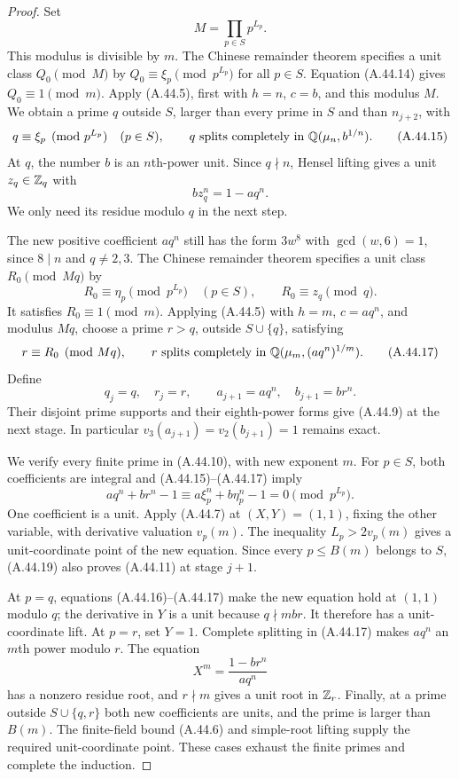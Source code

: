 \begin{proof}
Set
\[
                  M=\prod_{p\in S}p^{L_p}.
\]
This modulus is divisible by $m$. The Chinese remainder
theorem specifies a unit class $Q_0\pmod M$ by
$Q_0\equiv\xi_p\pmod {p^{L_p}}$ for all $p\in S$.
Equation (A.44.14) gives $Q_0\equiv1\pmod m$.
Apply (A.44.5), first with $h=n$, $c=b$, and this
modulus $M$. We obtain a prime $q$ outside $S$, larger
than every prime in $S$ and than $n_{j+2}$, with
\[
 q\equiv\xi_p\pmod {p^{L_p}}\quad(p\in S),
 \qquad q\text{ splits completely in }
                    \mathbb Q(\mu_n,b^{1/n}).
 \tag{A.44.15}
\]
At $q$, the number $b$ is an $n$th-power unit. Since
$q\nmid n$, Hensel lifting gives a unit $z_q\in\mathbb Z_q$
with
\[
                   b z_q^n=1-aq^n.
 \tag{A.44.16}
\]
We only need its residue modulo $q$ in the next step.

The new positive coefficient $a q^n$ still has the
form $3w^8$ with $\gcd(w,6)=1$, since $8\mid n$
and $q\ne2,3$. The Chinese remainder theorem specifies
a unit class $R_0\pmod {Mq}$ by
\[
 R_0\equiv\eta_p\pmod {p^{L_p}}\quad(p\in S),
 \qquad R_0\equiv z_q\pmod q.
\]
It satisfies $R_0\equiv1\pmod m$. Applying (A.44.5)
with $h=m$, $c=a q^n$, and modulus $Mq$, choose a
prime $r>q$, outside $S\cup\{q\}$, satisfying
\[
 r\equiv R_0\pmod {Mq},
 \qquad r\text{ splits completely in }
               \mathbb Q(\mu_m,(a q^n)^{1/m}).
 \tag{A.44.17}
\]
Define
\[
 q_j=q,\quad r_j=r,\qquad
 a_{j+1}=a q^n,\quad b_{j+1}=b r^n.
 \tag{A.44.18}
\]
Their disjoint prime supports and their eighth-power
forms give (A.44.9) at the next stage. In particular
$v_3(a_{j+1})=v_2(b_{j+1})=1$ remains exact.

We verify every finite prime in (A.44.10), with new
exponent $m$. For $p\in S$, both coefficients are
integral and (A.44.15)--(A.44.17) imply
\[
 a q^n+b r^n-1\equiv
       a\xi_p^n+b\eta_p^n-1=0\pmod {p^{L_p}}.
 \tag{A.44.19}
\]
One coefficient is a unit. Apply (A.44.7) at
$(X,Y)=(1,1)$, fixing the other variable, with
derivative valuation $v_p(m)$. The inequality
$L_p>2v_p(m)$ gives a unit-coordinate point of the
new equation. Since every $p\le B(m)$ belongs to
$S$, (A.44.19) also proves (A.44.11) at stage $j+1$.

At $p=q$, equations (A.44.16)--(A.44.17) make the
new equation hold at $(1,1)$ modulo $q$; the
derivative in $Y$ is a unit because $q\nmid mbr$.
It therefore has a unit-coordinate lift. At $p=r$,
set $Y=1$. Complete splitting in (A.44.17) makes
$a q^n$ an $m$th power modulo $r$. The equation
\[
                  X^m=\frac{1-b r^n}{a q^n}
\]
has a nonzero residue root, and $r\nmid m$ gives a
unit root in $\mathbb Z_r$. Finally, at a prime outside
$S\cup\{q,r\}$ both new coefficients are units,
and the prime is larger than $B(m)$. The finite-field
bound (A.44.6) and simple-root lifting supply the
required unit-coordinate point. These cases exhaust
the finite primes and complete the induction.


\end{proof}

